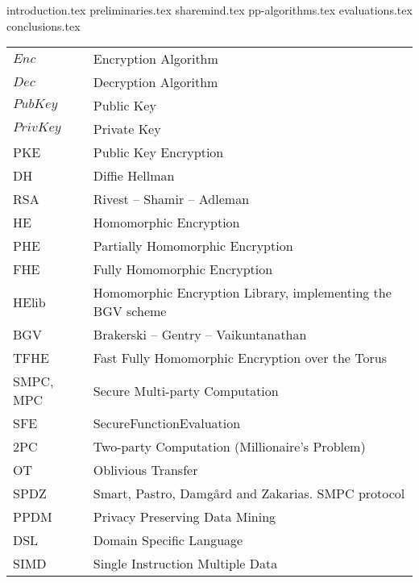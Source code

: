 \documentclass[inscr,ack]{dithesis}
\begin{document}
\frontmatter

\mainmatter


{introduction.tex}
{preliminaries.tex}
{sharemind.tex}
{pp-algorithms.tex}
{evaluations.tex}
{conclusions.tex}


\backmatter

\abbreviations
\begin{center}
	\renewcommand{\arraystretch}{1.5}
	\begin{longtable}{ l @{\qquad} l }
	\toprule
  $Enc$     & Encryption Algorithm \\
  $Dec$     & Decryption Algorithm \\
  $PubKey$  & Public Key \\
  $PrivKey$ & Private Key \\
  PKE       & Public Key Encryption \\
  DH        & Diffie Hellman \\
  RSA       & Rivest -- Shamir -- Adleman \\
  HE        & Homomorphic Encryption \\
  PHE       & Partially Homomorphic Encryption \\
  FHE       & Fully Homomorphic Encryption \\
  HElib     & Homomorphic Encryption Library, implementing the BGV scheme \\
  BGV       & Brakerski -- Gentry -- Vaikuntanathan \\
  TFHE      & Fast Fully Homomorphic Encryption over the Torus \\
  SMPC, MPC & Secure Multi-party Computation \\
  SFE       & SecureFunctionEvaluation \\
  2PC       & Two-party Computation (Millionaire's Problem) \\
  OT        & Oblivious Transfer \\
  SPDZ      & Smart, Pastro, Damg{\aa}rd and Zakarias. SMPC protocol \\
  PPDM      & Privacy Preserving Data Mining \\
  DSL       & Domain Specific Language \\
  SIMD      & Single Instruction Multiple Data \\

	\bottomrule
	\end{longtable}
\end{center}



\end{document}
